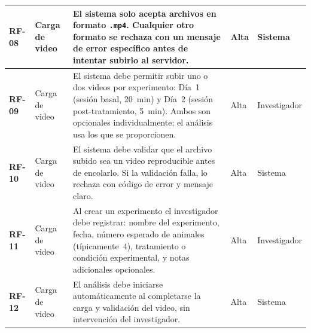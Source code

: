 \begin{longtable}{|>{\bfseries}p{1.1cm}|p{2.0cm}|p{6.7cm}|p{1.3cm}|p{1.7cm}|}
RF-08 & Carga de video
      & El sistema solo acepta archivos en formato \texttt{.mp4}. Cualquier otro
        formato se rechaza con un mensaje de error específico antes de intentar
        subirlo al servidor.
      & Alta & Sistema \\
\hline
RF-09 & Carga de video
      & El sistema debe permitir subir uno o dos videos por experimento: Día~1
        (sesión basal, 20~min) y Día~2 (sesión post-tratamiento, 5~min). Ambos son
        opcionales individualmente; el análisis usa los que se proporcionen.
      & Alta & Investigador \\
\hline
RF-10 & Carga de video
      & El sistema debe validar que el archivo subido sea un video reproducible antes
        de encolarlo. Si la validación falla, lo rechaza con código de error y
        mensaje claro.
      & Alta & Sistema \\
\hline
RF-11 & Carga de video
      & Al crear un experimento el investigador debe registrar: nombre del
        experimento, fecha, número esperado de animales (típicamente~4), tratamiento o
        condición experimental, y notas adicionales opcionales.
      & Alta & Investigador \\
\hline
RF-12 & Carga de video
      & El análisis debe iniciarse automáticamente al completarse la carga y
        validación del video, sin intervención del investigador.
      & Alta & Sistema \\
\hline


\end{longtable}

